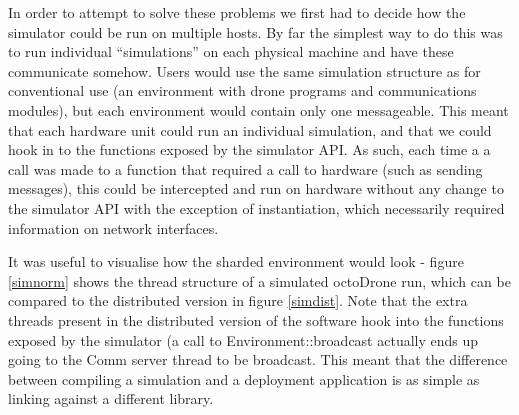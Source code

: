 In order to attempt to solve these problems we first had to decide how the simulator could be run on multiple hosts. By far the simplest way to do this was to run individual ``simulations'' on each physical machine and have these communicate somehow. Users would use the same simulation structure as for conventional use (an environment with drone programs and communications modules), but each environment would contain only one messageable. This meant that each hardware unit could run an individual simulation, and that we could hook in to the functions exposed by the simulator API. As such, each time a a call was made to a function that required a call to hardware (such as sending messages), this could be intercepted and run on hardware without any change to the simulator API with the exception of instantiation, which necessarily required information on network interfaces. 

It was useful to visualise how the sharded environment would look - figure \ref{simnorm} shows the thread structure of a simulated octoDrone run, which can be compared to the distributed version in figure \ref{simdist}. Note that the extra threads present in the distributed version of the software hook into the functions exposed by the simulator (a call to Environment::broadcast actually ends up going to the Comm server thread to be broadcast. This meant that the difference between compiling a simulation and a deployment application is as simple as linking against a different library.

